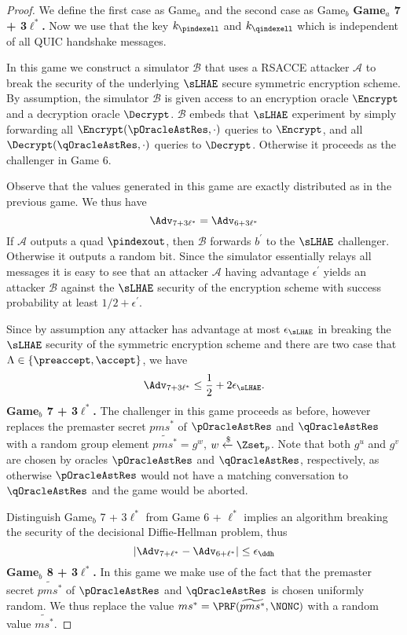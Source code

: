 \begin{proof}
 We define the first case as Game$_{a}$ and the second case as Game$_{b}$
%
%
 \textbf{Game$_a$ 7 + 3$\ell^{\ast}$.} Now we use that the key $k_{\pindexell}$ and $k_{\qindexell}$ which is independent of all QUIC handshake messages.

 In this game we construct a simulator $\mathcal{B}$ that uses a RSACCE attacker $\mathcal{A}$ to break the security of the underlying $\sLHAE$ secure symmetric encryption scheme. By assumption, the simulator $\mathcal{B}$ is given access to an encryption oracle $\Encrypt$ and a decryption oracle $\Decrypt$. $\mathcal{B}$ embeds that $\sLHAE$ experiment by simply forwarding all $\Encrypt(\pOracleAstRes,\cdot)$ queries to $\Encrypt$, and all $\Decrypt(\qOracleAstRes,\cdot)$ queries to $\Decrypt$. Otherwise it proceeds as the challenger in Game 6.

 Observe that the values generated in this game are exactly distributed as in the previous game. We thus have
 \begin{equation}
  \Adv_{7 + 3\ell^{\ast}} = \Adv_{6 + 3\ell^{\ast}}
 \end{equation}%
 If $\mathcal{A}$ outputs a quad $\pindexout$, then $\mathcal{B}$ forwards $b^{\prime}$ to the $\sLHAE$ challenger. Otherwise it outputs a random bit. Since the simulator essentially relays all messages it is easy to see that an attacker $\mathcal{A}$ having advantage $\epsilon^{\prime}$ yields an attacker $\mathcal{B}$ against the $\sLHAE$ security of the encryption scheme with success probability at least $1/2 + \epsilon^{\prime}$.

 Since by assumption any attacker has advantage at most $\epsilon_{\sLHAE}$ in breaking the $\sLHAE$ security of the symmetric encryption scheme and there are two case that $\Lambda \in \{\preaccept, \accept\}$, we have
 \begin{equation}
  \Adv_{7 + 3\ell^{\ast}} \leq \frac{1}{2} + 2\epsilon_{\sLHAE}.
 \end{equation}%
%
%
 \textbf{Game$_b$ 7 + 3$\ell^{\ast}$.} The challenger in this game proceeds as before, however replaces the premaster secret $pms^{\ast}$ of $\pOracleAstRes$ and $\qOracleAstRes$ with a random group element $\widetilde{pms^{\ast}} = g^w$, $w \xleftarrow{\$} \Zset_p$. Note that both $g^u$ and $g^v$ are chosen by oracles $\pOracleAstRes$ and $\qOracleAstRes$, respectively, as otherwise $\pOracleAstRes$ would not have a matching conversation to $\qOracleAstRes$ and the game would be aborted.

 Distinguish Game$_b$ 7 + 3$\ell^{\ast}$ from Game 6 + $\ell^{\ast}$ implies an algorithm breaking the security of the decisional Diffie-Hellman problem, thus
 \begin{equation}
  |\Adv_{7 + \ell^{\ast}} - \Adv_{6 + \ell^{\ast}}| \leq \epsilon_{\ddh}
 \end{equation}%
%
%
 \textbf{Game$_b$ 8 + 3$\ell^{\ast}$.} In this game we make use of the fact that the premaster secret $\widetilde{pms^{\ast}}$ of $\pOracleAstRes$ and $\qOracleAstRes$ is chosen uniformly random. We thus replace the value $ms^{\ast} = \PRF(\widetilde{pms^{\ast}}, \NONC)$ with a random value $\widetilde{ms^{\ast}}$.


\end{proof}
